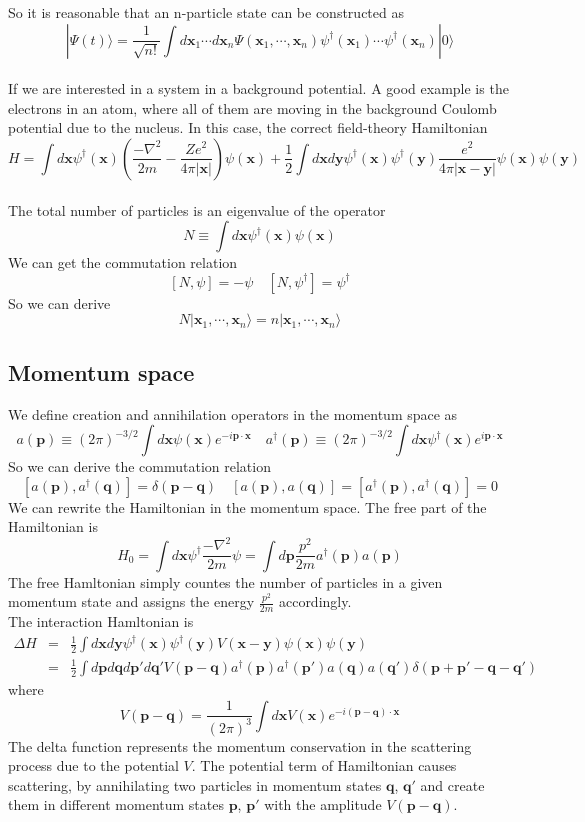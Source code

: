 \documentclass[cyan]{elegantnote}
\begin{document}
So it is reasonable that  an n-particle state can be constructed as
\[|\Psi(t)\rangle = \frac{1}{\sqrt{n!}} \int d\bm{x}_1 \cdots d\bm{x}_n \Psi(\bm{x}_1,\cdots,\bm{x}_n) \psi^{\dagger}(\bm{x}_1)\cdots\psi^{\dagger}(\bm{x}_n)|0\rangle\]
\\
If we are interested in a system in a background potential.  
A good example is the electrons in an atom, where all of them are moving in the background Coulomb potential due to the nucleus. In this case, the correct field-theory Hamiltonian
\[H = \int d\bm{x} \psi^{\dagger}(\bm{x}) \left(\frac{-\nabla^2}{2m} - \frac{Ze^2}{4\pi |\bm{x}|} \right)\psi(\bm{x}) + \frac{1}{2}\int d\bm{x} d\bm{y} \psi^{\dagger}(\bm{x}) \psi^{\dagger}(\bm{y}) \frac{e^2}{4\pi|\bm{x}-\bm{y}|} \psi(\bm{x})\psi(\bm{y})\]
\\
The total number of particles is an eigenvalue of the operator
\[N \equiv \int d\bm{x} \psi^{\dagger}(\bm{x})\psi(\bm{x})\]
We can get the commutation relation
\[[N,\psi] = -\psi \quad [N,\psi^{\dagger}] = \psi^{\dagger}\]
So we can derive
\[N|\bm{x}_1,\cdots,\bm{x}_n\rangle = n|\bm{x}_1,\cdots,\bm{x}_n\rangle\]

\subsection{Momentum space}
We define creation and annihilation operators in the
momentum space as
\[a(\bm{p}) \equiv (2\pi)^{-3/2}\int d\bm{x} \psi(\bm{x}) e^{-i\bm{p}\cdot\bm{x}} \quad a^{\dagger}(\bm{p}) \equiv  (2\pi)^{-3/2} \int d\bm{x} \psi^{\dagger}(\bm{x}) e^{i\bm{p}\cdot\bm{x}}\]
So we can derive the commutation relation
\[[a(\bm{p}),a^{\dagger}(\bm{q})] = \delta(\bm{p}-\bm{q}) \quad [a(\bm{p}),a(\bm{q})] = [a^{\dagger}(\bm{p}),a^{\dagger}(\bm{q})] = 0\]
We can rewrite the Hamiltonian in the momentum space. The
free part of the Hamiltonian is
\[H_0 = \int d\bm{x} \psi^{\dagger} \frac{-\nabla^2}{2m} \psi = \int d\bm{p} \frac{p^2}{2m} a^{\dagger}(\bm{p})a(\bm{p})\]
The free Hamltonian simply countes the number of particles in a given momentum state and assigns the energy $\frac{p^2}{2m}$ accordingly. \\
The interaction Hamltonian is
\begin{eqnarray}
\Delta H &=& \frac{1}{2}\int d\bm{x} d\bm{y} \psi^{\dagger}(\bm{x}) \psi^{\dagger}(\bm{y}) V(\bm{x} - \bm{y}) \psi(\bm{x})\psi(\bm{y})  \nonumber \\
&=& \frac{1}{2} \int d\bm{p}d\bm{q}d\bm{p}'d\bm{q}' V(\bm{p}-\bm{q}) a^{\dagger}(\bm{p}) a^{\dagger}(\bm{p}') a(\bm{q}) a(\bm{q}') \delta(\bm{p}+\bm{p}'-\bm{q}-\bm{q}')\nonumber
\end{eqnarray}
where
\[V(\bm{p}-\bm{q}) = \frac{1}{(2\pi)^3} \int d\bm{x} V(\bm{x}) e^{-i(\bm{p}-\bm{q})\cdot\bm{x}}\]
The delta function represents the momentum conservation in the scattering process due to the potential $V$. The potential term of Hamiltonian causes scattering, by annihilating two particles in momentum states $\bm{q}$, $\bm{q}'$ and create them in different momentum states $\bm{p}$, $\bm{p}'$ with the amplitude
$V(\bm{p}-\bm{q})$.
\end{document}
